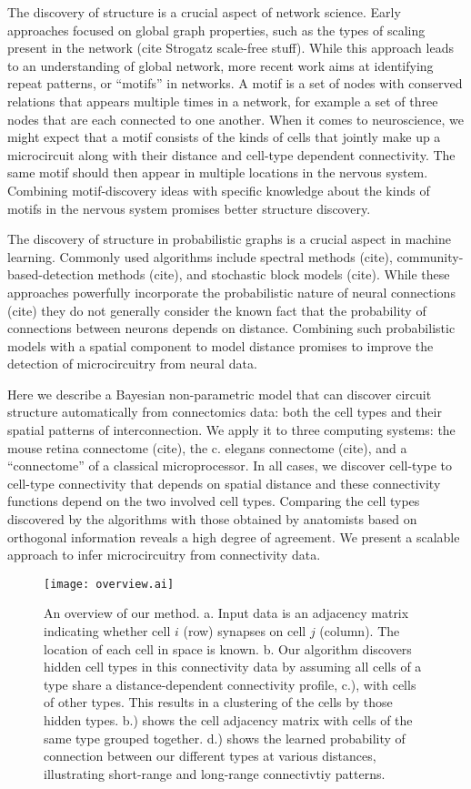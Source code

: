 \documentclass{article}
\begin{document}
The discovery of structure is a crucial aspect of network
science. Early approaches focused on global graph properties, such as
the types of scaling present in the network (cite Strogatz scale-free
stuff).  While this approach leads to an understanding of global
network, more recent work aims at identifying repeat patterns, or
“motifs” in networks. A motif is a set of nodes with conserved
relations that appears multiple times in a network, for example a set
of three nodes that are each connected to one another. When it comes
to neuroscience, we might expect that a motif consists of the kinds of
cells that jointly make up a microcircuit along with their distance
and cell-type dependent connectivity. The same motif should then
appear in multiple locations in the nervous system. Combining
motif-discovery ideas with specific knowledge about the kinds of
motifs in the nervous system promises better structure discovery.

The discovery of structure in probabilistic graphs is a crucial aspect
in machine learning. Commonly used algorithms include spectral methods
(cite), community-based-detection methods (cite), and stochastic block
models (cite). While these approaches powerfully incorporate the
probabilistic nature of neural connections (cite) they do not
generally consider the known fact that the probability of connections
between neurons depends on distance. Combining such probabilistic
models with a spatial component to model distance promises to improve
the detection of microcircuitry from neural data.

Here we describe a Bayesian non-parametric model that can discover
circuit structure automatically from connectomics data: both the cell
types and their spatial patterns of interconnection. We apply it to
three computing systems: the mouse retina connectome (cite), the
c. elegans connectome (cite), and a ``connectome'' of a classical
microprocessor. In all cases, we discover cell-type to cell-type
connectivity that depends on spatial distance and these connectivity
functions depend on the two involved cell types. Comparing the cell
types discovered by the algorithms with those obtained by anatomists
based on orthogonal information reveals a high degree of agreement. We
present a scalable approach to infer microcircuitry from connectivity
data.

\begin{figure}
  \centering 
    \centerline{\texttt{[image: overview.ai]}}
  \caption{An overview of our method. a. Input data is
an adjacency matrix indicating whether cell $i$ (row)
synapses on cell $j$ (column). The location of each cell in space is known. 
b. Our algorithm discovers hidden cell types in this connectivity data
by assuming all cells of a type share a distance-dependent connectivity 
profile, c.), with cells of other types. This results in a clustering 
of the cells by those hidden types. b.) shows the cell adjacency
matrix with cells of the same type grouped together. d.) shows
the learned probability of connection between our different types
at various distances, illustrating short-range and long-range
connectivtiy patterns.}

\end{figure}
\end{document}
